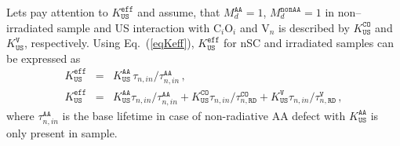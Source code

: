 \documentclass[aip,jap, amsmath,amssymb,reprint]{revtex4-1}
\begin{document}
Lets pay attention to $K_\mathtt{US}^\mathtt{eff}$ and assume, that
$M_d^\mathtt{AA}=1$, $M_d^\mathtt{nonAA}=1$ in non--irradiated sample and
US interaction with C$_i$O$_i$ and V$_n$ is described by $K_\mathtt{US}^\mathtt{CO}$ and $K_\mathtt{US}^\mathtt{V}$, respectively.
Using Eq.~(\ref{eqKeff}),
$K_\mathtt{US}^\mathtt{eff}$ for nSC and irradiated samples
can be expressed as
\begin{eqnarray}
K_\mathtt{US}^\mathtt{eff}&=&K_\mathtt{US}^\mathtt{AA}\,\tau_{n,in}/\tau_{n,in}^\mathtt{AA}\,,\nonumber\\
K_\mathtt{US}^\mathtt{eff}&=&K_\mathtt{US}^\mathtt{AA}\tau_{n,in}/\tau_{n,in}^\mathtt{AA}+
                           K_\mathtt{US}^\mathtt{CO}\tau_{n,in}/\tau_{n,\mathtt{RD}}^\mathtt{CO}+
                           K_\mathtt{US}^\mathtt{V}\tau_{n,in}/\tau_{n,\mathtt{RD}}^\mathtt{V} \,,\nonumber
\end{eqnarray}
where
$\tau_{n,in}^\mathtt{AA}$ is the base lifetime in case of non-radiative AA defect with $K_\mathtt{US}^\mathtt{AA}$ is only present in sample.

\end{document}
